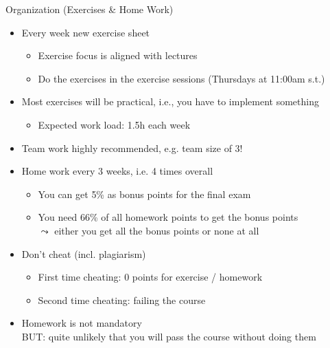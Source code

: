 \documentclass[aspectratio=169]{../latex_main/tntbeamer}  %
\begin{document}
\begin{frame}[c]{Organization (Exercises \& Home Work)}

\begin{itemize}
  \item Every week new exercise sheet
  \begin{itemize}
      \item Exercise focus is aligned with lectures
      \item Do the exercises in the exercise sessions (Thursdays at 11:00am s.t.)
  \end{itemize}
  \item Most exercises will be practical, i.e., you have to implement something
  \begin{itemize}
    \item Expected work load: 1.5h each week
  \end{itemize}
  \item Team work highly recommended, e.g. team size of 3!
  \item Home work every 3 weeks, i.e. 4 times overall
  \begin{itemize}
      \item You can get \alert{5\% as bonus points} for the final exam
      \item You need 66\% of all homework points to get the bonus points\\
      $\leadsto$ either you get all the bonus points or none at all
  \end{itemize}
  \pause
  \item Don't cheat (incl. plagiarism)
  \begin{itemize}
    \item First time cheating: $0$ points for exercise / homework
    \item Second time cheating: failing the course
  \end{itemize}
  \pause
  \item Homework is not mandatory\\ \alert{BUT: quite unlikely that you will pass the course without doing them}
  \pause
\end{itemize}

\end{frame}
\end{document}
